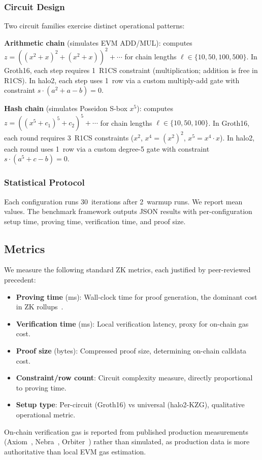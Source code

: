 \subsubsection{Circuit Design}

Two circuit families exercise distinct operational patterns:

\textbf{Arithmetic chain} (simulates EVM ADD/MUL): computes
$z = ((x^2 + x)^2 + (x^2 + x))^2 + \cdots$ for chain lengths
$\ell \in \{10, 50, 100, 500\}$. In Groth16, each step requires
1~R1CS constraint (multiplication; addition is free in R1CS). In
halo2, each step uses 1~row via a custom multiply-add gate with
constraint $s \cdot (a^2 + a - b) = 0$.

\textbf{Hash chain} (simulates Poseidon S-box $x^5$): computes
$z = ((x^5 + c_1)^5 + c_2)^5 + \cdots$ for chain lengths
$\ell \in \{10, 50, 100\}$. In Groth16, each round requires
3~R1CS constraints ($x^2$, $x^4 = (x^2)^2$, $x^5 = x^4 \cdot x$).
In halo2, each round uses 1~row via a custom degree-5 gate with
constraint $s \cdot (a^5 + c - b) = 0$.

\subsubsection{Statistical Protocol}

Each configuration runs 30~iterations after 2~warmup runs.
We report mean values. The benchmark framework outputs JSON
results with per-configuration setup time, proving time,
verification time, and proof size.

\subsection{Metrics}

We measure the following standard ZK metrics, each justified by
peer-reviewed precedent:

\begin{itemize}
  \item \textbf{Proving time} (ms): Wall-clock time for proof
    generation, the dominant cost in ZK
    rollups~\cite{zk-bottlenecks}.
  \item \textbf{Verification time} (ms): Local verification
    latency, proxy for on-chain gas cost.
  \item \textbf{Proof size} (bytes): Compressed proof size,
    determining on-chain calldata cost.
  \item \textbf{Constraint/row count}: Circuit complexity measure,
    directly proportional to proving time.
  \item \textbf{Setup type}: Per-circuit (Groth16) vs universal
    (halo2-KZG), qualitative operational metric.
\end{itemize}

On-chain verification gas is reported from published production
measurements (Axiom~\cite{axiom}, Nebra~\cite{nebra-gas},
Orbiter~\cite{orbiter-gas}) rather than simulated, as production
data is more authoritative than local EVM gas estimation.
